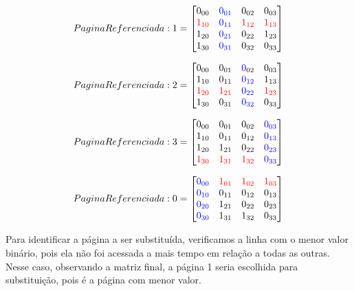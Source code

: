 \documentclass{article}
\begin{document}
\[
PaginaReferenciada: 1 =
\begin{bmatrix}
  0_{00} & \textcolor{blue}{0_{01}} & 0_{02} & 0_{03} \\
  \textcolor{red}{1_{10}} & \textcolor{blue}{0_{11}} & \textcolor{red}{1_{12}} & \textcolor{red}{1_{13}} \\
  1_{20} & \textcolor{blue}{0_{21}} & 0_{22} & 1_{23} \\
  1_{30} & \textcolor{blue}{0_{31}} & 0_{32} & 0_{33}
\end{bmatrix}
\]

\[
PaginaReferenciada: 2 =
\begin{bmatrix}
  0_{00} & 0_{01} & \textcolor{blue}0_{02} & 0_{03} \\
  {1_{10}} & {0_{11}} & \textcolor{blue}{0_{12}} & {1_{13}} \\
  \textcolor{red}{1_{20}} & \textcolor{red}{1_{21}} & \textcolor{blue}{0_{22}} & \textcolor{red}{1_{23}} \\
  1_{30} & {0_{31}} & \textcolor{blue}{0_{32}} & 0_{33}
\end{bmatrix}
\]

\[
PaginaReferenciada: 3 =
\begin{bmatrix}
  0_{00} & 0_{01} & 0_{02} & \textcolor{blue}{0_{03}} \\
  {1_{10}} & {0_{11}} & {0_{12}} & \textcolor{blue}{0_{13}} \\
  {1_{20}} & {1_{21}} & {0_{22}} & \textcolor{blue}{0_{23}} \\
  \textcolor{red}{1_{30}} & \textcolor{red}{1_{31}} & \textcolor{red}{1_{32}} & \textcolor{blue}{0_{33}}
\end{bmatrix}
\]

\[
PaginaReferenciada: 0 =
\begin{bmatrix}
    \textcolor{blue}{0_{00}} & \textcolor{red}{1_{01}} & \textcolor{red}{1_{02}} & \textcolor{red}{1_{03}} \\
    \textcolor{blue}{0_{10}} & {0_{11}} & {0_{12}} & {0_{13}} \\
    \textcolor{blue}{0_{20}} & {1_{21}} & {0_{22}} & {0_{23}} \\
    \textcolor{blue}{0_{30}} & {1_{31}} & {1_{32}} & {0_{33}}
\end{bmatrix}
\]

Para identificar a página a ser substituída, verificamos a linha com o menor valor binário, pois ela não foi acessada a mais tempo em relação a todas as outras. Nesse caso, observando a matriz final, a página 1 seria escolhida para substituição, pois é a página com menor valor.
\end{document}
